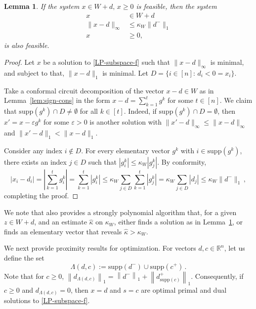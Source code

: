 \documentclass[11pt, a4paper]{article}
\newcommand{\Le}{\kappa}
\newcommand{\supp}{\mathrm{supp}}
\newcommand{\1}{\mathbbm{1}}
\newtheorem{lemma}[theorem]{Lemma}
\theoremstyle{case}
\newcommand{\R}{\mathbb{R}}
\begin{document}
\begin{lemma}\label{lem:feas}
 If the system $x\in W+d,\, x\ge 0$ 
   is feasible, then the system
  \begin{align*} 
  x&\in W+d\\
  \|x-d\|_\infty&\le \kappa_W \|d^-\|_1\\
  x&\ge 0,
  \end{align*}
  is also feasible.
  \end{lemma}
\begin{proof} 
Let $x$ be a solution to \ref{LP-subspace-f} such that $\|x-d\|_\infty$ is minimal, and subject to that, $\|x-d\|_1$ is minimal. Let $D=\{i\in [n]:\, d_i<0=x_i\}$.

  Take a conformal circuit decomposition of the  vector $x - d \in W$ as in Lemma~\ref{lem:sign-cons} in the form $x-d = \sum_{k = 1}^t g^k$ for some $t \in [n]$. We claim that $\supp(g^k)\cap D\neq \emptyset$ for all $k\in [t]$. Indeed, if $\supp(g^k)\cap D=\emptyset$, then $x'=x-\varepsilon g^k$ for some $\varepsilon>0$ is another solution with $\|x'-d\|_\infty\le \|x-d\|_\infty$ and $\|x'-d\|_1< \|x-d\|_1$.

Consider any index $i\notin D$. For every elementary vector $g^k$ with $i\in \supp(g^k)$, there exists an index $j\in D$ such that $|g^k_i|\le \Le_W |g_j^k|$. By conformity, 
\[
|x_i-d_i|=\left|\sum_{k=1}^t g^k_i\right|=\sum_{k=1}^t \left|g^k_i\right|\le\Le_W \sum_{j\in D} \sum_{k=1}^t\left|g^k_j\right|=\Le_W\sum_{j\in D} |d_j|\le \Le_W\|d^-\|_1\, ,
\]
completing the proof.
\end{proof}

We note that  \cite{DadushNV20} also provides a strongly polynomial algorithm that, for a given $z\in W+d$, and an estimate $\hat \Le$ on $\Le_W$, either finds a solution as in Lemma~\ref{lem:feas}, or finds an elementary vector that reveals $\hat \Le>\Le_W$.

We next provide proximity results for optimization.
For vectors $d,c\in \R^n$, let us define the set
\begin{equation}\label{theta-def}
\Lambda(d,c):=\supp(d^-)\cup \supp(c^+)\, .
\end{equation}
 Note that for $c\ge 0$,
$\left\|d_{\Lambda(d,c)}\right\|_1=\left\|d^-\right\|_1 +\left\|d_{\supp(c)}^+\right\|_1$.
Consequently, if $c\ge 0$ and $d_{\Lambda(d,c)}=0$, then $x=d$ and $s=c$ are optimal primal and dual solutions to \ref{LP-subspace-f}.
\end{document}
